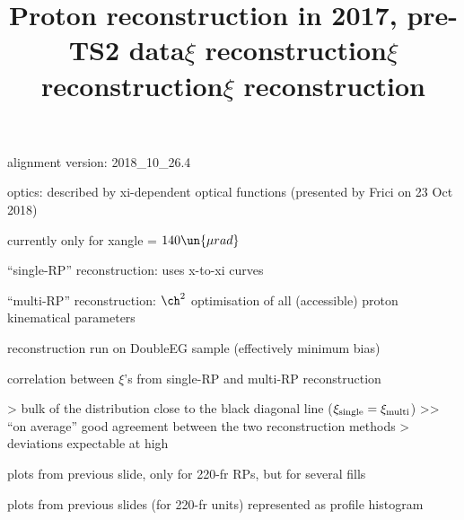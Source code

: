 
%

\newpage %

\def\author{J.~Kaspar}
\def\caption{Proton reconstruction, 2017, pre-TS2}
\def\date{22 Feb 2019}

\newpage %
\title{Proton reconstruction in 2017, pre-TS2 data}

\> alignment version: 2018\_10\_26.4

\> optics: described by xi-dependent optical functions (presented by Frici on 23 Oct 2018)

\> currently only for xangle = $140\un{\mu rad}$

\> ``single-RP'' reconstruction: uses x-to-xi curves

\> ``multi-RP'' reconstruction: $\ch^2$ optimisation of all (accessible) proton kinematical parameters

\> reconstruction run on DoubleEG sample (effectively minimum bias)



\newpage %
\title{$\xi$ reconstruction}

\> correlation between $\xi$'s from single-RP and multi-RP reconstruction

\centerline{}

\>> bulk of the distribution close to the black diagonal line ($\xi_{\rm single} = \xi_{\rm multi}$)
\>>> ``on average'' good agreement between the two reconstruction methods
\>> deviations expectable at high

\newpage %
\title{$\xi$ reconstruction}

\> plots from previous slide, only for 220-fr RPs, but for several fills

\centerline{}


\newpage %
\title{$\xi$ reconstruction}

\> plots from previous slides (for 220-fr units) represented as profile histogram

\centerline{}

